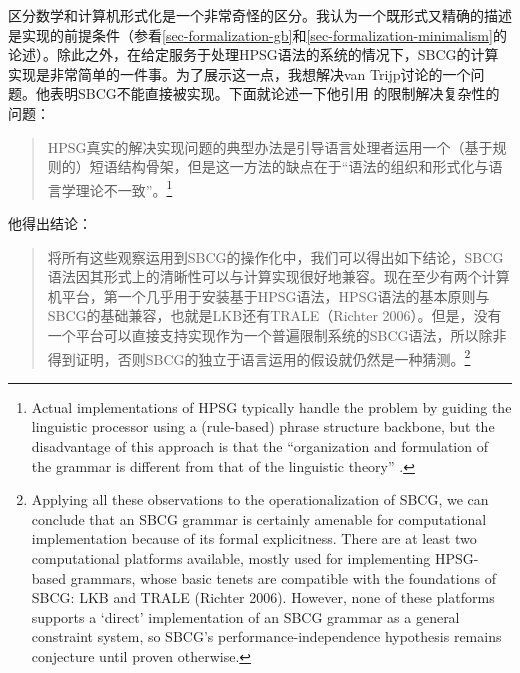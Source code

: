 
区分数学和计算机形式化是一个非常奇怪的区分。我认为一个既形式又精确的描述是实现的前提条件（参看\ref{sec-formalization-gb}和\ref{sec-formalization-minimalism}的论述）。除此之外，在给定服务于处理HPSG语法的系统的情况下，SBCG的计算实现是非常简单的一件事。为了展示这一点，我想解决van Trijp讨论的一个问题。他表明SBCG不能直接被实现。下面就论述一下他引用 \citep[\S~4.2.2]{LM2006a}的限制解决复杂性的问题：
\begin{quotation}
HPSG真实的解决实现问题的典型办法是引导语言处理者运用一个（基于规则的）短语结构骨架，但是这一方法的缺点在于“语法的组织和形式化与语言学理论不一致”\citep[\S~4.2.2]{LM2006a}。\citep[]{vanTrijp2013a}\footnote{%
Actual implementations of HPSG typically handle the problem by guiding the linguistic processor
using a (rule-based) phrase structure backbone, but the disadvantage of this approach is that the ``organization and formulation of the grammar is different from
that of the linguistic theory'' \citep[Section~4.2.2]{LM2006a}.}
\end{quotation}
他得出结论：
\begin{quotation}
将所有这些观察运用到SBCG的操作化中，我们可以得出如下结论，SBCG语法因其形式上的清晰性可以与计算实现很好地兼容。现在至少有两个计算机平台，第一个几乎用于安装基于HPSG语法，HPSG语法的基本原则与SBCG的基础兼容，也就是LKB\citep{Copestake2002a}还有TRALE（Richter 2006）。但是，没有一个平台可以直接支持实现作为一个普遍限制系统的SBCG语法，所以除非得到证明，否则SBCG的独立于语言运用的假设就仍然是一种猜测。\footnote{%
Applying all these observations to the operationalization of SBCG, we can
conclude that an SBCG grammar is certainly amenable for computational implementation because of its formal explicitness. There are at least two computational
platforms available, mostly used for implementing HPSG-based grammars, whose
basic tenets are compatible with the foundations of SBCG: LKB \citep{Copestake2002a}
and TRALE (Richter 2006). However, none of these platforms supports a `direct'
implementation of an SBCG grammar as a general constraint system, so SBCG's
performance-independence hypothesis remains conjecture until proven otherwise.}
\end{quotation}
